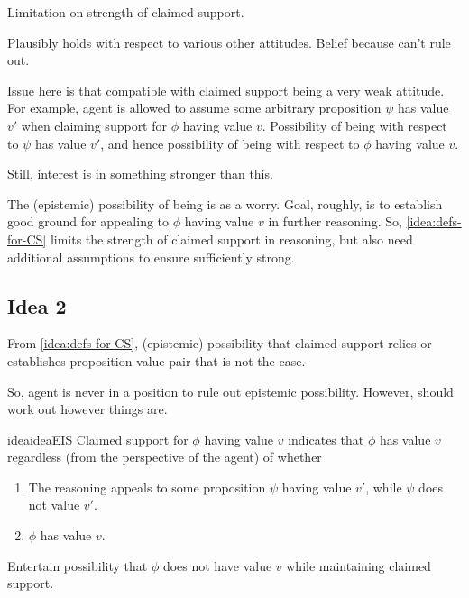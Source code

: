 \begin{note}
  Limitation on strength of claimed support.

  Plausibly holds with respect to various other attitudes.
  Belief because can't rule out.

  Issue here is that compatible with claimed support being a very weak attitude.
  For example, agent is allowed to assume some arbitrary proposition \(\psi\) has value \(v'\) when claiming support for \(\phi\) having value \(v\).
  Possibility of being \mistaken{} with respect to \(\psi\) has value \(v'\), and hence possibility of being \misled{} with respect to \(\phi\) having value \(v\).

  Still, interest is in something stronger than this.

  The (epistemic) possibility of being \mom{} is as a worry.
  Goal, roughly, is to establish good ground for appealing to \(\phi\) having value \(v\) in further reasoning.
  So, \autoref{idea:defs-for-CS} limits the strength of claimed support in reasoning, but also need additional assumptions to ensure sufficiently strong.
\end{note}

\subsection{Idea 2}
\label{sec:idea-2}

\begin{note}[]
  From \autoref{idea:defs-for-CS}, (epistemic) possibility that claimed support relies or establishes proposition-value pair that is not the case.

  So, agent is never in a position to rule out epistemic possibility.
  However, should work out however things are.

  \begin{restatable}[\ideaCSB{-} --- \ideaCSB{}]{idea}{ideaEIS}
    \label{idea:eiS}
    Claimed support for \(\phi\) having value \(v\) indicates that \(\phi\) has value \(v\) regardless (from the perspective of the agent) of whether
    \begin{enumerate}
    \item The reasoning appeals to some proposition \(\psi\) having value \(v'\), while \(\psi\) does not value \(v'\).
    \item \(\phi\) has value \(v\).
    \end{enumerate}
  \end{restatable}
  Entertain possibility that \(\phi\) does not have value \(v\) while maintaining claimed support.
\end{note}

